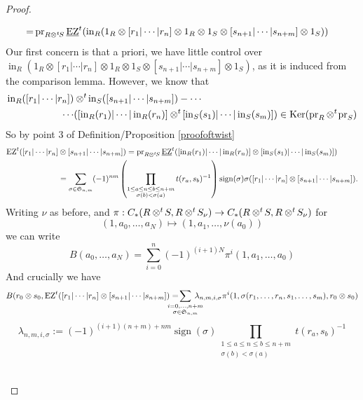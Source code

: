 \documentclass{article}
\newcommand{\ten}{\otimes}
\newcommand{\twisten}{\otimes^t\hspace{-1pt}}
\newcommand{\ezt}{\operatorname{EZ}^t}
\newcommand{\pr}{\operatorname{pr}}
\newcommand{\inc}{\operatorname{in}}
\newcommand{\elr}{[r_1 | \cdots | r_n]}
\newcommand{\els}{[s_{n+1} | \cdots |s_{n+m}]}
\newcommand{\bezt}{\underline{\operatorname{EZ}}^t}
\newcommand{\sign}{\operatorname{sign}}
\theoremstyle{plain}
\theoremstyle{definition}
\begin{document}
\begin{proof}
\begin{pfparts}
$$\begin{aligned}
=& \pr_{R \twisten S}\bezt(\inc_R(1_R \otimes \elr \otimes 1_R \otimes 1_S \otimes \els \otimes 1_S)) \end{aligned}$$
Our first concern is that a priori, we have little control over $\inc_R(1_R \otimes \elr \otimes 1_R \otimes 1_S \otimes \els \otimes 1_S)$, as it is induced from the comparison lemma. However, we know that
$$\begin{aligned} \inc_R([r_1 | \cdots | r_n]) & \twisten \inc_S(\els) - \cdots  \\ \cdots  &([\inc_R(r_1) | \cdots | \inc_R(r_n)] \twisten [\inc_S(s_1) | \cdots | \inc_S(s_m)]) \in \operatorname{Ker}(\pr_R \twisten \pr_S) \end{aligned}$$
So by point 3 of Definition/Proposition \ref{proofoftwist}
$$\begin{aligned} \ezt(\elr &\ten \els) = \pr_{R \twisten S} \bezt ([\inc_R(r_1) | \cdots | \inc_R(r_n) ] \ten [ \inc_S(s_1) | \cdots | \inc_S(s_m)]) \\
 &= \sum_{\sigma \in \mathfrak{S}_{n,m}} (-1)^{nm}\left(\prod_{\substack{1\leq a \leq n \leq b  \leq n+m \\ \sigma(b) < \sigma(a)}} t(r_a, s_b)^{-1} \right) \sign(\sigma) \sigma([r_1 | \cdots | r_n] \ten \els).
\end{aligned}$$
Writing $\nu$ as before, and $\pi:C_*(R \twisten S, R \twisten S_\nu) \rightarrow C_{*}(R \twisten S, R \twisten S_\nu)$ for
$$(1, a_0, \ldots, a_{N}) \mapsto (1, a_1, \ldots, \nu(a_0))$$
we can write 
$$B(a_0, \ldots, a_{N}) = \sum_{i=0}^n (-1)^{(i+1)N} \pi^i(1, a_1, \ldots, a_0)$$
And crucially we have 
\begin{equation}\label{formofb} B(r_0 \otimes s_0, \ezt (\elr \ten \els) = \hspace{-16pt}\sum_{\substack{i=0, \ldots, n+m  \\ \sigma \in \mathfrak{S}_{n,m}}}\hspace{-12pt}\lambda_{n,m, i,  \sigma}\pi^i(1, \sigma (r_1, \ldots, r_n, s_1, \ldots, s_m), r_0 \otimes s_0)\end{equation}
$$\lambda_{n,m, i, \sigma} := (-1)^{(i+1)(n+m)+nm} \sign(\sigma) \prod_{\substack{1\leq a \leq n \leq b  \leq n+m \\ \sigma(b) < \sigma(a)}} t(r_a, s_b)^{-1} $$\\[3pt]


\end{pfparts}
\end{proof}
\end{document}

